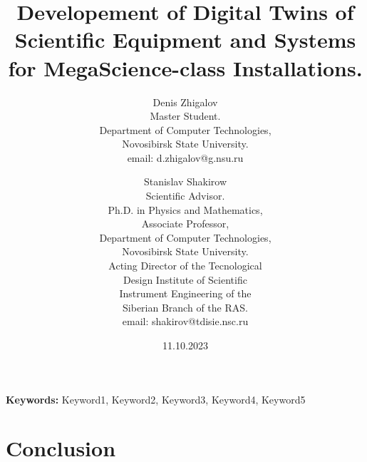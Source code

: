 \documentclass[12pt]{article}
\begin{document}
\title{Developement of Digital Twins of Scientific Equipment and Systems for MegaScience-class Installations.}
\author{
  Denis Zhigalov\\ 
  \small{Master Student.} \\ 
  \small{Department of Computer Technologies,} \\ 
  \small{Novosibirsk State University.} \\
  \small{email: d.zhigalov@g.nsu.ru}
  \and 
  Stanislav Shakirow \\ 
  \small{Scientific Advisor.} \\
  \small{Ph.D. in Physics and Mathematics,} \\
  \small{Associate Professor,} \\
  \small{Department of Computer Technologies,} \\ 
  \small{Novosibirsk State University.} \\
  \small {Acting Director of the Tecnological} \\ 
  \small {Design Institute of Scientific} \\
  \small{Instrument Engineering of the} \\
  \small{Siberian Branch of the RAS.} \\
  \small{email: shakirov@tdisie.nsc.ru}
}
\date{11.10.2023}
\maketitle


\begin{abstract}
\end{abstract}

\textbf{Keywords:} Keyword1, Keyword2, Keyword3, Keyword4, Keyword5













\section{Conclusion}




\end{document}
